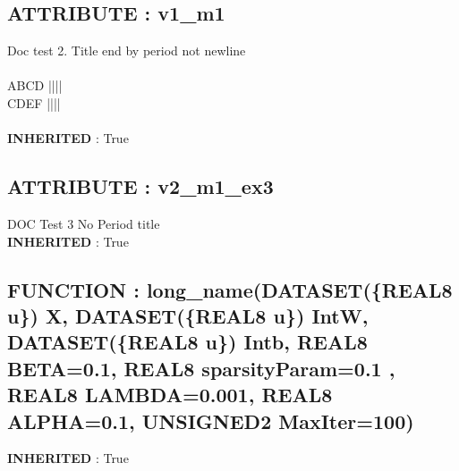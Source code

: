 \subsection*{ATTRIBUTE : v1\_m1}
\hypertarget{ecldoc:intest.in1intest.example_4_example_3.mod_1.v1_m1}{}
Doc test 2. Title end by period not newline  \\
 \\
 ABCD |||| \\
 CDEF |||| \\
 \\
\textbf{INHERITED} : True \\
\subsection*{ATTRIBUTE : v2\_m1\_ex3}
\hypertarget{ecldoc:intest.in1intest.example_4_example_3.mod_1.v2_m1_ex3}{}
DOC Test 3 No Period title \\
\textbf{INHERITED} : True \\
\subsection*{FUNCTION : long\_name(DATASET(\{REAL8 u\}) X, DATASET(\{REAL8 u\}) IntW, DATASET(\{REAL8 u\}) Intb, REAL8 BETA=0.1, REAL8 sparsityParam=0.1 , REAL8 LAMBDA=0.001, REAL8 ALPHA=0.1, UNSIGNED2 MaxIter=100)}
\hypertarget{ecldoc:intest.in1intest.example_4_example_3.mod_1.long_name}{}
\textbf{INHERITED} : True \\


